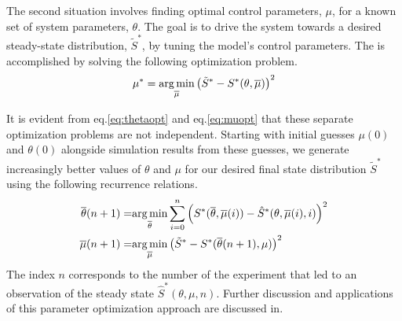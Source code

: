 \documentclass[Main.tex]{subfiles}
\begin{document}
The second situation involves finding optimal control parameters, $\mu$, for a known set of system parameters, $\theta$. The goal is to drive the system towards a desired steady-state distribution, $\tilde{S}^*$, by tuning the model's control parameters. The is accomplished by solving the following optimization problem.
\begin{equation}
	\mu^* = \underset{\overline{\mu}}{\operatorname*{arg\,min}}\left(\tilde{S}^* - S^*(\theta, \overline{\mu})\right)^2 \label{eq:muopt}
\end{equation}

It is evident from eq.\eqref{eq:thetaopt} and eq.\eqref{eq:muopt} that these separate optimization problems are not independent. Starting with initial guesses $\mu(0)$ and $\theta(0)$ alongside simulation results from these guesses, we generate increasingly better values of $\theta$ and $\mu$ for our desired final state distribution $\tilde{S}^*$ using the following recurrence relations.
\begin{align}\label{eq:paramrel}
	\overline{\theta}(n + 1) = & \underset{\overline{\theta}}{\operatorname*{arg\,min}}\sum\limits_{i=0}^{n}\left(S^*(\overline{\theta},\overline{\mu}(i)) - \hat{S}^*(\theta, \overline{\mu}(i), i)\right)^2\\
	\overline{\mu}(n + 1) = & \underset{\overline{\mu}}{\operatorname*{arg\,min}}\left(\tilde{S}^* - S^*(\overline{\theta}(n + 1), \mu)\right)^2
\end{align}
The index $n$ corresponds to the number of the experiment that led to an observation of the steady state $\hat{S}^*(\theta, \mu, n)$. Further discussion and applications of this parameter optimization approach are discussed in\cite{Correll2006a,Correll2008}.
\end{document}
